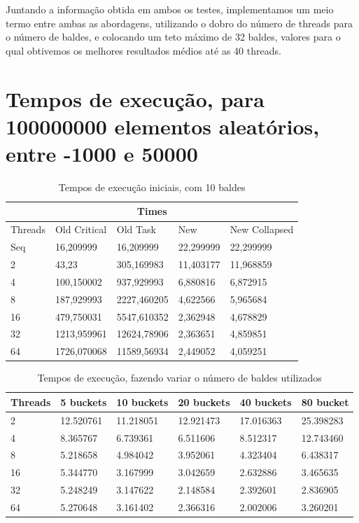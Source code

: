 \documentclass[a4paper]{report}
\begin{document}
Juntando a informação obtida em ambos os testes, implementamos um meio termo
entre ambas as abordagens, utilizando o dobro do número de threads para o número
de baldes, e colocando um teto máximo de 32 baldes, valores para o qual obtivemos os melhores
resultados médios até as 40 threads.

\appendix

\chapter{Tempos de execução, para 100000000 elementos aleatórios, entre -1000 e 50000}
\begin{table}[h]
\centering
\begin{tabular}{|l|l|l|l|l|}
\hline
\multicolumn{5}{|c|}{Times}                                      \\ \hline
Threads & Old Critical & Old Task    & New       & New Collapsed \\ \hline
Seq     & 16,209999    & 16,209999   & 22,299999 & 22,299999     \\ \hline
2       & 43,23        & 305,169983  & 11,403177 & 11,968859     \\ \hline
4       & 100,150002   & 937,929993  & 6,880816  & 6,872915      \\ \hline
8       & 187,929993   & 2227,460205 & 4,622566  & 5,965684      \\ \hline
16      & 479,750031   & 5547,610352 & 2,362948  & 4,678829      \\ \hline
32      & 1213,959961  & 12624,78906 & 2,363651  & 4,859851      \\ \hline
64      & 1726,070068  & 11589,56934 & 2,449052  & 4,059251      \\ \hline
\end{tabular}
\caption{\label{tab:Times}Tempos de execução iniciais, com 10 baldes}
\end{table}

\begin{table}[h]
\centering
\begin{tabular}{|l|l|l|l|l|l|}
\hline
Threads & 5 buckets & 10 buckets & 20 buckets & 40 buckets & 80 bucket \\ \hline
2       & 12.520761 & 11.218051  & 12.921473  & 17.016363  & 25.398283 \\ \hline
4       & 8.365767  & 6.739361   & 6.511606   & 8.512317   & 12.743460 \\ \hline
8       & 5.218658  & 4.984042   & 3.952061   & 4.323404   & 6.438317  \\ \hline
16      & 5.344770  & 3.167999   & 3.042659   & 2.632886   & 3.465635  \\ \hline
32      & 5.248249  & 3.147622   & 2.148584   & 2.392601   & 2.836905  \\ \hline
64      & 5.270648  & 3.161402   & 2.366316   & 2.002006   & 3.260201  \\ \hline
\end{tabular}
\caption{\label{tab:fix_size}Tempos de execução, fazendo variar o
    número de baldes utilizados}
\end{table}
\end{document}

